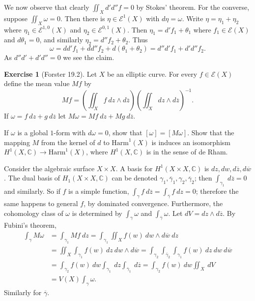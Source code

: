 \documentclass[10pt]{article}
\newcommand{\CC}{\mathbb{C}}
\theoremstyle{definition}
\newtheorem{exer}{Exercise}
\begin{document}
We now observe that clearly $\iint_X d'd''f = 0$ by Stokes' theorem.
For the converse, suppose $\iint_X \omega = 0$.
Then there is $\eta \in \mathscr E^1(X)$ with $d\eta = \omega$.
Write $\eta = \eta_1 + \eta_2$ where $\eta_1 \in \mathscr E^{1,0}(X)$ and $\eta_2 \in \mathscr E^{0,1}(X)$.
Then $\eta_1 = d'f_1 + \theta_1$ where $f_1 \in \mathscr E(X)$ and $d\theta_1 = 0$, and similarly $\eta_2 = d''f_2 + \theta_2$.
Thus
$$\omega = dd'f_1 + dd''f_2 + d(\theta_1 + \theta_2) = d''d' f_1 + d'd'' f_2.$$
As $d''d' + d'd'' = 0$ we see the claim.

\begin{exer}[Forster 19.2]
Let $X$ be an elliptic curve. For every $f \in \mathscr E(X)$ define the mean value $Mf$ by
$$Mf = \left(\iint_X f ~dz \wedge d\overline z\right)\left(\iint_X dz \wedge d\overline z\right)^{-1}.$$
If $\omega = f~dz + g~d\overline z$ let $M\omega = Mf ~dz + Mg ~d\overline z$.

If $\omega$ is a global $1$-form with $d\omega = 0$, show that $[\omega] = [M\omega]$. Show that the mapping $M$ from the kernel of $d$ to $\text{Harm}^1(X)$ is induces an isomorphism $H^1(X, \CC) \to \text{Harm}^1(X)$, where $H^1(X, \CC)$ is in the sense of de Rham.
\end{exer}

Consider the algebraic surface $X \times X$.
A basis for $H^1(X \times X, \CC)$ is $dz, dw, d\overline z, d\overline w$.
The dual basis of $H_1(X \times X, \CC)$ can be denoted $\gamma_1, \overline \gamma_1, \gamma_2, \overline \gamma_2$; then $\int_{\gamma_1} ~d\overline z = 0$ and similarly.
So if $f$ is a simple function, $\int_\gamma f~d\overline z = \int_{\overline \gamma} f ~dz = 0$; therefore the same happens to general $f$, by dominated convergence.
Furthermore, the cohomology class of $\omega$ is determined by $\int_\gamma \omega$ and $\int_{\overline \gamma} \omega$.
Let $dV = dz \wedge d\overline z$.
By Fubini's theorem,
\begin{align*}
\int_\gamma M\omega &= \int_{\gamma_1} Mf ~dz = \int_{\gamma_1} \iint_X f(w) ~dw \wedge d\overline w ~dz\\
&= \iint_X \int_{\gamma_1} f(w) ~dz ~dw \wedge d\overline w = \int_{\gamma_2} \int_{\overline \gamma_2} \int_{\gamma_1} f(w) ~dz ~dw ~d\overline w\\
&= \int_{\gamma_2} f(w) ~dw \int_{\gamma_1} ~dz \int_{\overline \gamma_1} ~d\overline z = \int_{\gamma_2} f(w) ~dw \iint_X ~dV \\
&= V(X) \int_\gamma \omega.
\end{align*}
Similarly for $\overline \gamma$.
\end{document}
